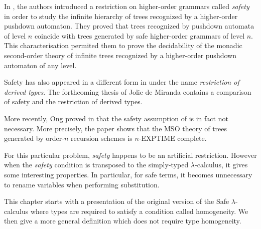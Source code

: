 
In \cite{KNU02}, the authors introduced a restriction on
higher-order grammars called \emph{safety} in order to study the
infinite hierarchy of trees recognized by a higher-order pushdown
automaton. They proved that trees recognized by pushdown automata of
level $n$ coincide with trees generated by safe higher-order
grammars of level $n$. This characterisation permited them to prove
the decidability of the monadic second-order theory of infinite
trees recognized by a higher-order pushdown automaton of any level.

Safety has also appeared in a different form in \cite{Dam82} under
the name \emph{restriction of derived types}. The forthcoming thesis
of Jolie de Miranda \citep{demirandathesis} contains a comparison of
safety and the restriction of derived types.

More recently, Ong proved in \cite{OngLics2006} that the safety
assumption of \cite{KNU02} is in fact not necessary. More precisely,
the paper shows that the MSO theory of trees generated by order-$n$
recursion schemes is $n$-EXPTIME complete.

For this particular problem, \emph{safety} happens to be an
artificial restriction. However when the \emph{safety} condition is
transposed to the simply-typed $\lambda$-calculus, it gives some
interesting properties. In particular, for safe terms, it becomes
unnecessary to rename variables when performing substitution.

This chapter starts with a presentation of the original version of
the Safe $\lambda$-calculus where types are required to satisfy a
condition called homogeneity. We then give a more general definition
which does not require type homogeneity.
